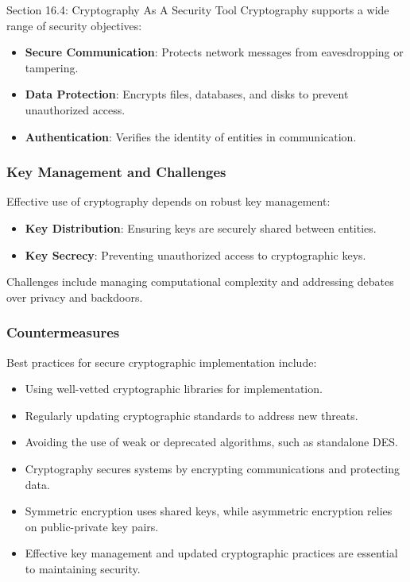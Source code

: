 \begin{notes}{Section 16.4: Cryptography As A Security Tool}
    Cryptography supports a wide range of security objectives:
    \begin{itemize}
        \item \textbf{Secure Communication}: Protects network messages from eavesdropping or tampering.
        \item \textbf{Data Protection}: Encrypts files, databases, and disks to prevent unauthorized access.
        \item \textbf{Authentication}: Verifies the identity of entities in communication.
    \end{itemize}
    
    \subsubsection*{Key Management and Challenges}
    
    Effective use of cryptography depends on robust key management:
    \begin{itemize}
        \item \textbf{Key Distribution}: Ensuring keys are securely shared between entities.
        \item \textbf{Key Secrecy}: Preventing unauthorized access to cryptographic keys.
    \end{itemize}
    Challenges include managing computational complexity and addressing debates over privacy and backdoors.
    
    \subsubsection*{Countermeasures}
    
    Best practices for secure cryptographic implementation include:
    \begin{itemize}
        \item Using well-vetted cryptographic libraries for implementation.
        \item Regularly updating cryptographic standards to address new threats.
        \item Avoiding the use of weak or deprecated algorithms, such as standalone DES.
    \end{itemize}
    
    \begin{highlight}
        \begin{itemize}
            \item Cryptography secures systems by encrypting communications and protecting data.
            \item Symmetric encryption uses shared keys, while asymmetric encryption relies on public-private key pairs.
            \item Effective key management and updated cryptographic practices are essential to maintaining security.
        \end{itemize}
    \end{highlight}
\end{notes}

